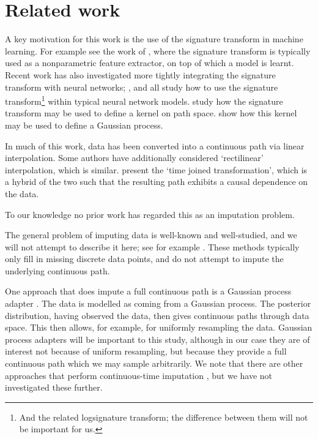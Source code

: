 \documentclass{article}
\begin{document}
\section{Related work}
A key motivation for this work is the use of the signature transform in machine learning. For example see the work of \cite{primer2016, kormilitzlin2016, yang2016rotation, li2017lpsnet, yang2017leveraging, PerezArribas2018, morrill2019sepsis}, where the signature transform is typically used as a nonparametric feature extractor, on top of which a model is learnt. Recent work has also investigated more tightly integrating the signature transform with neural networks; \cite{jeremythesis}, \cite{logsigrnn} and \cite{kidger2019deep} all study how to use the signature transform\footnote{And the related logsignature transform; the difference between them will not be important for us.} within typical neural network models. \cite{chevyrev2018signature, kiraly2019kernels} study how the signature transform may be used to define a kernel on path space. \cite{toth2019gp} show how this kernel may be used to define a Gaussian process.

In much of this work, data has been converted into a continuous path via linear interpolation. Some authors \cite{primer2016, fermanian2019embedding} have additionally considered `rectilinear' interpolation, which is similar. \cite{levin2013} present the `time joined transformation', which is a hybrid of the two such that the resulting path exhibits a causal dependence on the data.

To our knowledge no prior work has regarded this as an imputation problem.

The general problem of imputing data is well-known and well-studied, and we will not attempt to describe it here; see for example \cite[Chapter 25]{gelman2007dataanalysis}. %
These methods typically only fill in missing discrete data points, and do not attempt to impute the underlying continuous path.

One approach that does impute a full continuous path is a Gaussian process adapter \cite{li2016scalable, futoma2017mgp}. The data is modelled as coming from a Gaussian process. The posterior distribution, having observed the data, then gives continuous paths through data space. This then allows, for example, for uniformly resampling the data. Gaussian process adapters will be important to this study, although in our case they are of interest not because of uniform resampling, but because they provide a full continuous path which we may sample arbitrarily. We note that there are other approaches that perform continuous-time imputation \cite{shukla2018interpolationprediction}, but we have not investigated these further.
\end{document}
